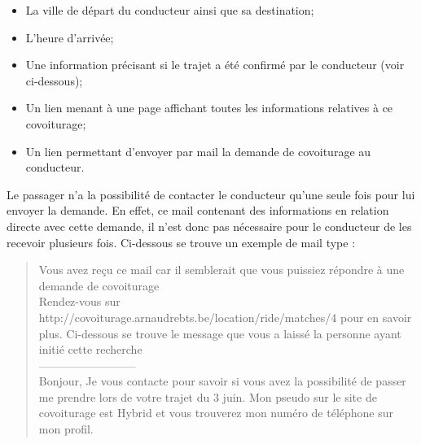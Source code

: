 \documentclass[12pt, a4paper, oneside]{article}
\begin{document}
{{\begin{itemize}
        \item La ville de départ du conducteur ainsi que sa destination;
        \item L'heure d'arrivée;
        \item Une information précisant si le trajet a été confirmé par le conducteur (voir ci-dessous);
        \item Un lien menant à une page affichant toutes les informations relatives à ce covoiturage;
        \item Un lien permettant d'envoyer par mail la demande de covoiturage au conducteur.\\
     \end{itemize}
     Le passager n'a la possibilité de contacter le conducteur qu'une seule fois pour lui envoyer la demande. En effet, ce mail contenant des informations en relation directe avec cette demande, il n'est donc pas nécessaire pour le conducteur de les recevoir plusieurs fois. Ci-dessous se trouve un exemple de mail type :
     \begin{quote}\label{mail-exemple}
         Vous avez reçu ce mail car il semblerait que vous puissiez répondre à une demande de covoiturage\\
         Rendez-vous sur http://covoiturage.arnaudrebts.be/location/ride/matches/4 pour en savoir plus.
          Ci-dessous se trouve le message que vous a laissé la personne ayant initié cette recherche\\
          --------------------------\\
            Bonjour,
            Je vous contacte pour savoir si vous avez la possibilité de passer me prendre lors de votre trajet du 3 juin.
            Mon pseudo sur le site de covoiturage est Hybrid et vous trouverez mon numéro de téléphone sur mon profil.\\
            

\end{quote}}}
\end{document}
